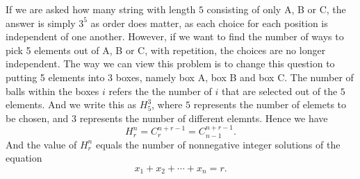 
\mynewpage


\begin{mysubsection}{}
    If we are asked how many string with length $5$ consisting of only A, B or C, the answer is simply $3^5$ as order does matter, as each choice for each position is independent of one another. However, if we want to find the number of ways to pick 5 elements out of A, B or C, with repetition, the choices are no longer independent. The way we can view this problem is to change this question to putting 5 elements into 3 boxes, namely box A, box B and box C. The number of balls within the boxes $i$ refers the the number of $i$ that are selected out of the $5$ elements. And we write this as $H_5^3$, where $5$ represents the number of elemets to be chosen, and $3$ represents the number of different elemnts. Hence we have
    \[H_r^n=C_{r}^{n+r-1} =C_{n-1}^{n+r-1} .\]
    And the value of $H_r^n$ equals the number of nonnegative integer solutions of the equation
    \[x_1+x_2+\cdots +x_n=r.\]
\end{mysubsection}

\toggletrue{ownans}
\begin{shortque}[]{1}
\end{shortque}
